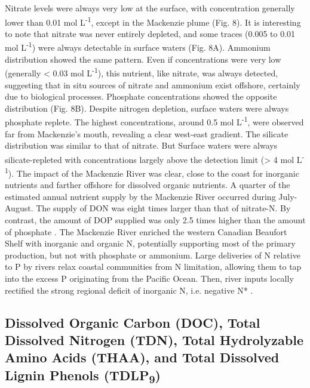 \documentclass[essd, manuscript]{copernicus}
\begin{document}
Nitrate levels were always very low at the surface, with concentration generally lower than 0.01 \textmu mol L\textsuperscript{-1}, except in the Mackenzie plume (Fig. 8). It is interesting to note that nitrate was never entirely depleted, and some traces (0.005 to 0.01 \textmu mol L\textsuperscript{-1}) were always detectable in surface waters (Fig. 8A). Ammonium distribution showed the same pattern. Even if concentrations were very low (generally < 0.03 \textmu mol L\textsuperscript{-1}), this nutrient, like nitrate, was always detected, suggesting that in situ sources of nitrate and ammonium exist offshore, certainly due to biological processes. Phosphate concentrations showed the opposite distribution (Fig. 8B). Despite nitrogen depletion, surface waters were always phosphate replete. The highest concentrations, around 0.5 \textmu mol L\textsuperscript{-1}, were observed far from Mackenzie’s mouth, revealing a clear west-east gradient. The silicate distribution was similar to that of nitrate. But Surface waters were always silicate-repleted with concentrations largely above the detection limit (> 4 \textmu mol L\textsuperscript{-1}). The impact of the Mackenzie River was clear, close to the coast for inorganic nutrients and farther offshore for dissolved organic nutrients. A quarter of the estimated annual nutrient supply by the Mackenzie River occurred during July-August. The supply of DON was eight times larger than that of nitrate-N. By contrast, the amount of DOP supplied was only 2.5 times higher than the amount of phosphate \citep{Tremblay2014}. The Mackenzie River enriched the western Canadian Beaufort Shelf with inorganic and organic N, potentially supporting most of the primary production, but not with phosphate or ammonium. Large deliveries of N relative to P by rivers relax coastal communities from N limitation, allowing them to tap into the excess P originating from the Pacific Ocean. Then, river inputs locally rectified the strong regional deficit of inorganic N, i.e. negative N* \citep{Tremblay2014}.

\subsection{Dissolved Organic Carbon (DOC), Total Dissolved Nitrogen (TDN), Total Hydrolyzable Amino Acids (THAA), and Total Dissolved Lignin Phenols (TDLP\textsubscript{9})}
\end{document}
